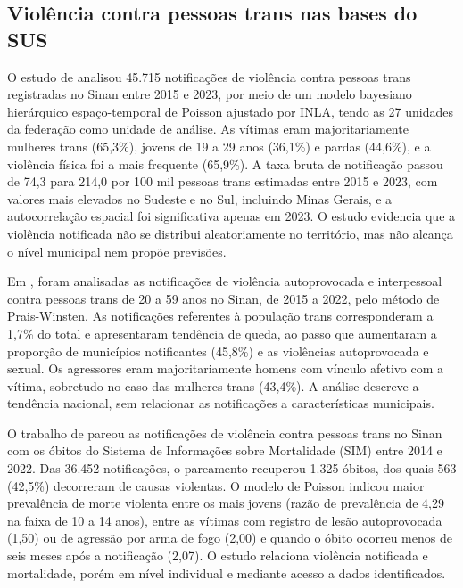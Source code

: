 \documentclass[12pt]{article}
\begin{document}
\subsection{Violência contra pessoas trans nas bases do SUS}

O estudo de \cite{leal_silva_lizzi:2026} analisou 45.715 notificações de violência contra pessoas trans registradas no Sinan entre 2015 e 2023, por meio de um modelo bayesiano hierárquico espaço-temporal de Poisson ajustado por INLA, tendo as 27 unidades da federação como unidade de análise. As vítimas eram majoritariamente mulheres trans (65,3\%), jovens de 19 a 29 anos (36,1\%) e pardas (44,6\%), e a violência física foi a mais frequente (65,9\%). A taxa bruta de notificação passou de 74,3 para 214,0 por 100 mil pessoas trans estimadas entre 2015 e 2023, com valores mais elevados no Sudeste e no Sul, incluindo Minas Gerais, e a autocorrelação espacial foi significativa apenas em 2023. O estudo evidencia que a violência notificada não se distribui aleatoriamente no território, mas não alcança o nível municipal nem propõe previsões.

Em \cite{marinho_tomazelli_firianelli:2024}, foram analisadas as notificações de violência autoprovocada e interpessoal contra pessoas trans de 20 a 59 anos no Sinan, de 2015 a 2022, pelo método de Prais-Winsten. As notificações referentes à população trans corresponderam a 1,7\% do total e apresentaram tendência de queda, ao passo que aumentaram a proporção de municípios notificantes (45,8\%) e as violências autoprovocada e sexual. Os agressores eram majoritariamente homens com vínculo afetivo com a vítima, sobretudo no caso das mulheres trans (43,4\%). A análise descreve a tendência nacional, sem relacionar as notificações a características municipais.

O trabalho de \cite{luis:2025} pareou as notificações de violência contra pessoas trans no Sinan com os óbitos do Sistema de Informações sobre Mortalidade (SIM) entre 2014 e 2022. Das 36.452 notificações, o pareamento recuperou 1.325 óbitos, dos quais 563 (42,5\%) decorreram de causas violentas. O modelo de Poisson indicou maior prevalência de morte violenta entre os mais jovens (razão de prevalência de 4,29 na faixa de 10 a 14 anos), entre as vítimas com registro de lesão autoprovocada (1,50) ou de agressão por arma de fogo (2,00) e quando o óbito ocorreu menos de seis meses após a notificação (2,07). O estudo relaciona violência notificada e mortalidade, porém em nível individual e mediante acesso a dados identificados.
\end{document}
